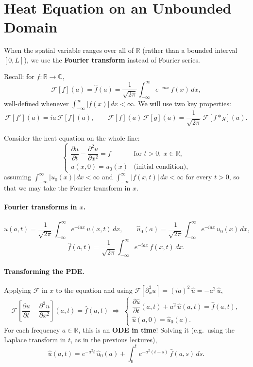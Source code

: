 

\section{Heat Equation on an Unbounded Domain}

When the spatial variable ranges over all of $\mathbb{R}$ (rather than a bounded interval $[0, L]$), we use the \textbf{Fourier transform} instead of Fourier series.

Recall: for $f : \mathbb{R} \to \mathbb{C}$,
\[
\mathcal{F}[f](a) = \hat{f}(a) = \frac{1}{\sqrt{2\pi}}\int_{-\infty}^{\infty} e^{-iax}\,f(x)\,dx,
\]
well-defined whenever $\int_{-\infty}^{\infty} |f(x)|\,dx < \infty$. We will use two key properties:
\[
\mathcal{F}[f'](a) = ia\,\mathcal{F}[f](a), \qquad
\mathcal{F}[f](a)\,\mathcal{F}[g](a) = \frac{1}{\sqrt{2\pi}}\,\mathcal{F}[f * g](a).
\]

Consider the heat equation on the whole line:
\[
\begin{cases}
\dfrac{\partial u}{\partial t} - \dfrac{\partial^2 u}{\partial x^2} = f & \text{for } t > 0,\ x \in \mathbb{R}, \\[2pt]
u(x, 0) = u_0(x) & \text{(initial condition),}
\end{cases}
\]
assuming $\int_{-\infty}^{\infty} |u_0(x)|\,dx < \infty$ and $\int_{-\infty}^{\infty} |f(x, t)|\,dx < \infty$ for every $t > 0$, so that we may take the Fourier transform in $x$.

\paragraph{Fourier transforms in $x$.}
\[
\hat{u}(a, t) = \frac{1}{\sqrt{2\pi}}\int_{-\infty}^{\infty} e^{-iax}\,u(x, t)\,dx, \qquad
\hat{u}_0(a) = \frac{1}{\sqrt{2\pi}}\int_{-\infty}^{\infty} e^{-iax}\,u_0(x)\,dx,
\]
\[
\hat{f}(a, t) = \frac{1}{\sqrt{2\pi}}\int_{-\infty}^{\infty} e^{-iax}\,f(x, t)\,dx.
\]

\paragraph{Transforming the PDE.}
Applying $\mathcal{F}$ in $x$ to the equation and using $\mathcal{F}[\partial_x^2 u] = (ia)^2\,\hat{u} = -a^2\,\hat{u}$,
\[
\mathcal{F}\!\left[\frac{\partial u}{\partial t} - \frac{\partial^2 u}{\partial x^2}\right](a, t) = \hat{f}(a, t)
\;\Longrightarrow\;
\begin{cases}
\dfrac{\partial \hat{u}}{\partial t}(a, t) + a^2\,\hat{u}(a, t) = \hat{f}(a, t), \\[4pt]
\hat{u}(a, 0) = \hat{u}_0(a).
\end{cases}
\]
For each frequency $a \in \mathbb{R}$, this is an \textbf{ODE in time}! Solving it (e.g.\ using the Laplace transform in $t$, as in the previous lectures),
\[
\boxed{\hat{u}(a, t) = e^{-a^2 t}\,\hat{u}_0(a) + \int_0^t e^{-a^2(t - s)}\,\hat{f}(a, s)\,ds.}
\]

